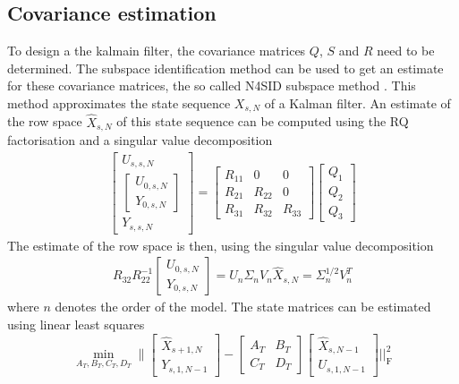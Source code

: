 \subsection{Covariance estimation}
To design a the kalmain filter, the covariance matrices $Q$, $S$ and $R$ need to be determined. The subspace identification method can be used to get an estimate for these covariance matrices, the so called N4SID subspace method \cite{VANOVERSCHEE199475}. This method approximates the state sequence $X_{s,N}$ of a Kalman filter. An estimate of the row space $\hat{X}_{s,N}$ of this state sequence can be computed using the RQ factorisation and a singular value decomposition
\begin{align*}
    \begin{bmatrix} U_{s,s,N} \\ \begin{bmatrix} U_{0,s,N} \\ Y_{0,s,N}\end{bmatrix} \\ Y_{s,s,N} \end{bmatrix} = \begin{bmatrix} R_{11} & 0 & 0 \\ R_{21} & R_{22} & 0 \\ R_{31} & R_{32} & R_{33}\end{bmatrix}\begin{bmatrix} Q_1 \\ Q_2 \\ Q_3 \end{bmatrix}
\end{align*}
The estimate of the row space is then, using the singular value decomposition
\begin{align*}
    R_{32}R_{22}^{-1} \begin{bmatrix} U_{0,s,N} \\ Y_{0,s,N}\end{bmatrix} = U_n\Sigma_nV_n
    \hat{X}_{s,N} = \Sigma_n^{1/2}V_n^T
\end{align*}
where $n$ denotes the order of the model. The state matrices can be estimated using linear least squares
$$
\min _{A_{T}, B_{T}, C_{T}, D_{T}} \|\left[\begin{array}{c}
\widehat{X}_{s+1, N} \\
Y_{s, 1, N-1}
\end{array}\right]-\left[\begin{array}{cc}
A_{T} & B_{T} \\
C_{T} & D_{T}
\end{array}\right]\left[\begin{array}{c}
\widehat{X}_{s, N-1} \\
U_{s, 1, N-1}
\end{array}\right]||_{\mathrm{F}}^{2}
$$
